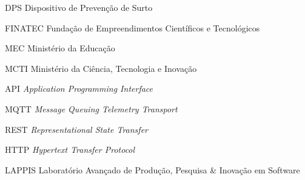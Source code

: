 \begin{siglas}
  \item [DPS] Dispositivo de Prevenção de Surto
  \item [FINATEC] Fundação de Empreendimentos Científicos e Tecnológicos
  \item [MEC] Ministério da Educação
  \item [MCTI] Ministério da Ciência, Tecnologia e Inovação
  \item [API] \textit{Application Programming Interface}
  \item [MQTT] \textit{Message Queuing Telemetry Transport}
  \item [REST] \textit{Representational State Transfer}
  \item [HTTP] \textit{Hypertext Transfer Protocol}
  \item [LAPPIS] Laboratório Avançado de Produção, Pesquisa & Inovação em Software

\end{siglas}
